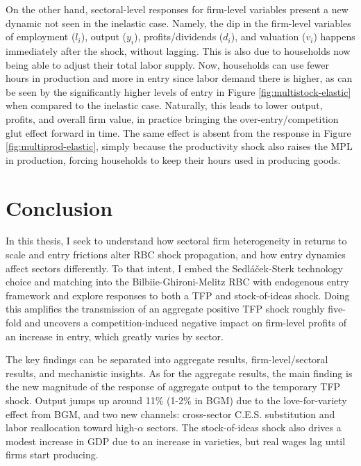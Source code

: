 \documentclass[a4paper,12pt]{article} %
\numberwithin{equation}{section} %
\numberwithin{figure}{section}
\numberwithin{table}{section}
\begin{document}
On the other hand, sectoral-level responses for firm-level variables present a new dynamic not seen in the inelastic case. Namely, the dip in the
firm-level variables of employment ($l_i$), output ($y_i$), profits/dividends ($d_i$), and valuation ($v_i$) happens immediately after the shock,
without lagging. This is also due to households now being able to adjust their total labor supply. Now, households can use fewer hours in production
and more in entry since labor demand there is higher, as can be seen by the significantly higher levels of entry in Figure \ref{fig:multistock-elastic}
when compared to the inelastic case. Naturally, this leads to lower output, profits, and overall firm value, in practice bringing the 
over-entry/competition glut effect forward in time. The same effect is absent from the response in Figure \ref{fig:multiprod-elastic}, simply because
the productivity shock also raises the MPL in production, forcing households to keep their hours used in producing goods. 



\section{Conclusion}
\label{sec:conclusion}

In this thesis, I seek to understand how sectoral firm heterogeneity in returns to scale and entry frictions alter RBC shock propagation, and how
entry dynamics affect sectors differently.
To that intent, I embed the Sedláček-Sterk technology choice and matching into the Bilbiie-Ghironi-Melitz RBC with endogenous entry framework and explore
responses to both a TFP and stock-of-ideas shock.
Doing this amplifies the transmission of an aggregate positive TFP shock roughly five-fold and uncovers a competition-induced negative 
impact on firm-level profits of an increase in entry, which greatly varies by sector. 

The key findings can be separated into aggregate results, firm-level/sectoral results, and mechanistic insights. As for the aggregate results,
the main finding is the new magnitude of the response of aggregate output to the temporary TFP shock. Output jumps up around 11\%  (1-2\% in BGM) due to 
the love-for-variety effect from BGM, and two new channels: cross-sector C.E.S. substitution and labor reallocation toward high-$\alpha$ sectors.
The stock-of-ideas shock also drives a modest increase in GDP due to an increase in varieties, but real wages lag until firms start producing.
\end{document}
